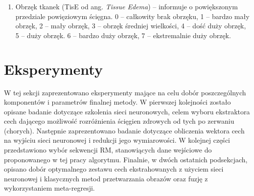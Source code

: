 \begin{enumerate}
	\item Obrzęk tkanek (TisE od ang. \textit{Tissue Edema}) -- informuje o powiększonym przedziale powięziowym ścięgna. 0  – całkowity brak obrzęku, 1 – bardzo mały obrzęk, 2 – mały obrzęk, 3 – obrzęk średniej wielkości, 4 – dość duży obrzęk, 5 – duży obrzęk. 6 – bardzo duży obrzęk, 7 -- ekstremalnie duży obrzęk.
\end{enumerate}

\section{Eksperymenty}
\label{seq:experiments}
W tej sekcji zaprezentowano eksperymenty mające na celu dobór poszczególnych komponentów i parametrów finalnej metody. W pierwszej kolejności zostało opisane badanie dotyczące szkolenia sieci neuronowych, celem wyboru ekstraktora cech dającego możliwość rozróżnienia ścięgien zdrowych od tych po zerwaniu (chorych). Następnie zaprezentowano badanie dotyczące obliczenia wektora cech na wyjściu sieci neuronowej i redukcji jego wymiarowości. W kolejnej części przedstawiono wybór sekwencji RM, stanowiących dane wejściowe do proponowanego w tej pracy algorytmu. Finalnie, w dwóch ostatnich podsekcjach, opisano dobór optymalnego zestawu cech ekstrahowanych z użyciem sieci neuronowej i klasycznych metod przetwarzania obrazów oraz fuzję z wykorzystaniem meta-regresji.  


